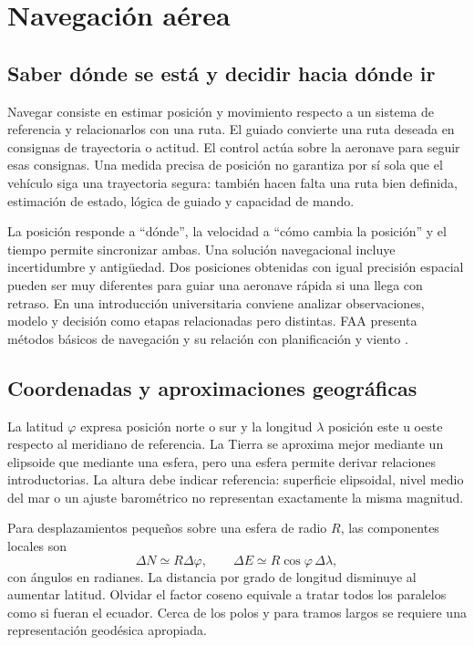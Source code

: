 \chapter{Navegación aérea}\label{ch:14}

\section{Saber dónde se está y decidir hacia dónde ir}
Navegar consiste en estimar posición y movimiento respecto a un sistema de referencia y relacionarlos con una ruta. El guiado convierte una ruta deseada en consignas de trayectoria o actitud. El control actúa sobre la aeronave para seguir esas consignas. Una medida precisa de posición no garantiza por sí sola que el vehículo siga una trayectoria segura: también hacen falta una ruta bien definida, estimación de estado, lógica de guiado y capacidad de mando.

La posición responde a ``dónde'', la velocidad a ``cómo cambia la posición'' y el tiempo permite sincronizar ambas. Una solución navegacional incluye incertidumbre y antigüedad. Dos posiciones obtenidas con igual precisión espacial pueden ser muy diferentes para guiar una aeronave rápida si una llega con retraso. En una introducción universitaria conviene analizar observaciones, modelo y decisión como etapas relacionadas pero distintas. FAA presenta métodos básicos de navegación y su relación con planificación y viento \cite{PHAK}.

\section{Coordenadas y aproximaciones geográficas}
La latitud $\varphi$ expresa posición norte o sur y la longitud $\lambda$ posición este u oeste respecto al meridiano de referencia. La Tierra se aproxima mejor mediante un elipsoide que mediante una esfera, pero una esfera permite derivar relaciones introductorias. La altura debe indicar referencia: superficie elipsoidal, nivel medio del mar o un ajuste barométrico no representan exactamente la misma magnitud.

Para desplazamientos pequeños sobre una esfera de radio $R$, las componentes locales son
\begin{equation}\label{eq:14-local}
\Delta N\simeq R\Delta\varphi,\qquad
\Delta E\simeq R\cos\varphi\,\Delta\lambda,
\end{equation}
con ángulos en radianes. La distancia por grado de longitud disminuye al aumentar latitud. Olvidar el factor coseno equivale a tratar todos los paralelos como si fueran el ecuador. Cerca de los polos y para tramos largos se requiere una representación geodésica apropiada.

